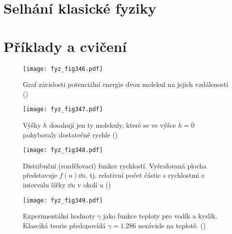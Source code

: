  \section{Selhání klasické fyziky}\label{fyz:IchapXLsecVI}
  \section{Příklady a cvičení}\label{fyz:IchapXLsecVII}
  
    \begin{figure}[ht!] %
      \centering
      \texttt{[image: fyz\_fig346.pdf]}
      \caption{Graf závislosti potenciální energie dvou molekul na jejich vzdálenosti
               (\cite[s.~543]{Feynman01})}
      \label{fyz:fig346}
    \end{figure}

    \begin{figure}[ht!] %
      \centering
      \texttt{[image: fyz\_fig347.pdf]}
      \caption{Výšky \(h\) dosahují jen ty molekuly, které se ve výšce \(h=0\) pohybovaly 
               dostatečně rychle
               (\cite[s.~545]{Feynman01})}
      \label{fyz:fig347}
    \end{figure}

    \begin{figure}[ht!] %
      \centering
      \texttt{[image: fyz\_fig348.pdf]}
      \caption{Distribuční (rozdělovací) funkce rychlostí. Vyšrafovaná plocha představuje 
               \(f(u)\dd{u}\), tj. relativní počet částic s rychlostmi z intervalu šířky \(\dd{u}\) 
               v okolí \(u\)
               (\cite[s.~525]{Feynman01})}
      \label{fyz:fig348}
    \end{figure}

    \begin{figure}[ht!] %
      \centering
      \texttt{[image: fyz\_fig349.pdf]}
      \caption{Experimentální hodnoty \(\gamma\) jako funkce teploty pro vodík a kyslík. Klasciká 
               teorie předopovídá \(\gamma =\num{1.286}\) nezávisle na teplotě. 
               (\cite[s.~525]{Feynman01})}
      \label{fyz:fig349}
    \end{figure}
